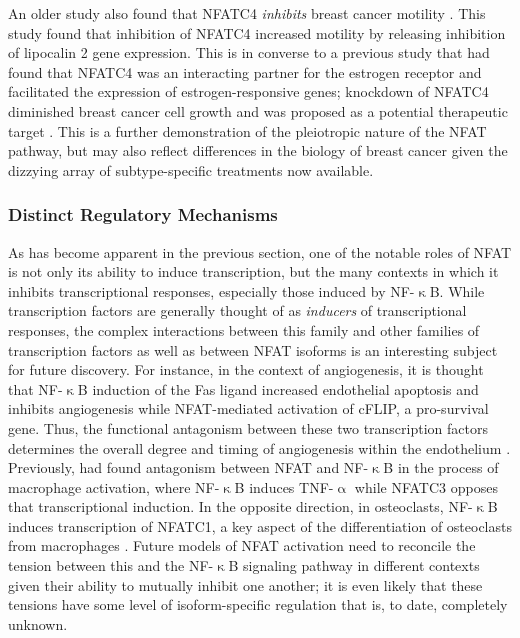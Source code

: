 An older study also found that NFATC4 \textit{inhibits} breast cancer motility \citep{Fougere2010}. This study found that inhibition of NFATC4 increased motility by releasing inhibition of lipocalin 2 gene expression. This is in converse to a previous study that had found that NFATC4 was an interacting partner for the estrogen receptor and facilitated the expression of estrogen\hyp{}responsive genes; knockdown of NFATC4 diminished breast cancer cell growth and was proposed as a potential therapeutic target \citep{Zhang2005}. This is a further demonstration of the pleiotropic nature of the NFAT pathway, but may also reflect differences in the biology of breast cancer given the dizzying array of subtype\hyp{}specific treatments now available.

\subsubsection{Distinct Regulatory Mechanisms}\label{nfatreg}

As has become apparent in the previous section, one of the notable roles of NFAT is not only its ability to induce transcription, but the many contexts in which it inhibits transcriptional responses, especially those induced by NF\hyp{}$\upkappa$B. While transcription factors are generally thought of as \textit{inducers} of transcriptional responses, the complex interactions between this family and other families of transcription factors as well as between NFAT isoforms is an interesting subject for future discovery. For instance, in the context of angiogenesis, it is thought that NF\hyp{}$\upkappa$B induction of the Fas ligand increased endothelial apoptosis and inhibits angiogenesis while NFAT\hyp{}mediated activation of cFLIP, a pro\hyp{}survival gene. Thus, the functional antagonism between these two transcription factors determines the overall degree and timing of angiogenesis within the endothelium \citep{Aurora2010}. Previously, \citet{Conboy1999} had found antagonism between NFAT and NF\hyp{}$\upkappa$B in the process of macrophage activation, where NF\hyp{}$\upkappa$B induces TNF\hyp{}$\upalpha$ while NFATC3 opposes that transcriptional induction. In the opposite direction, in osteoclasts, NF\hyp{}$\upkappa$B induces transcription of NFATC1, a key aspect of the differentiation of osteoclasts from macrophages \citep{Asagiri2005}. Future models of NFAT activation need to reconcile the tension between this and the NF\hyp{}$\upkappa$B signaling pathway in different contexts given their ability to mutually inhibit one another; it is even likely that these tensions have some level of isoform\hyp{}specific regulation that is, to date, completely unknown. 

